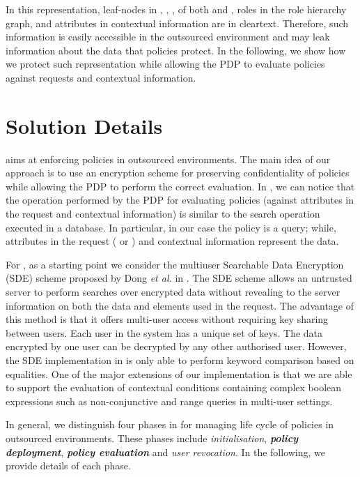 \documentclass[final,5p,times,twocolumn]{elsarticle}
\begin{document}
In this representation, leaf-nodes in , , ,  of both  and , roles in the role hierarchy graph, and attributes in contextual information are in cleartext. Therefore, such information is easily accessible in the outsourced environment and may leak information about the data that policies protect. In the following, we show how we protect such representation while allowing the PDP to evaluate policies against requests and contextual information.

\section{Solution Details}
\label{sec:solution-details}

 aims at enforcing policies in outsourced environments. The main idea of our approach is to use an encryption scheme for preserving confidentiality of policies while allowing the PDP to perform the correct evaluation. In , we can notice that the operation performed by the PDP for evaluating policies (against attributes in the request and contextual information) is similar to the search operation executed in a database. In particular, in our case the policy is a query; while, attributes in the request ( or ) and contextual information represent the data.

For , as a starting point we consider the multiuser Searchable Data Encryption (SDE) scheme proposed by Dong \emph{et al.} in \cite{Dong2011}. The SDE scheme allows an untrusted server to perform searches over encrypted data without revealing to the server information on both the data and elements used in the request. The advantage of this method is that it offers multi-user access without requiring key sharing between users. Each user in the system has a unique set of keys. The data encrypted by one user can be decrypted by any other authorised user. However, the SDE implementation in \cite{Dong2011} is only able to perform keyword comparison based on equalities. One of the major extensions of our implementation is that we are able to support the evaluation of contextual conditions containing complex boolean expressions such as non-conjunctive and range queries in multi-user settings.

In general, we distinguish four phases in  for managing life cycle of policies in outsourced environments. These phases include \emph{initialisation}, \emph{\textbf{policy deployment}}, \emph{\textbf{policy evaluation}} and \emph{user revocation}. In the following, we provide details of each phase.
\end{document}
